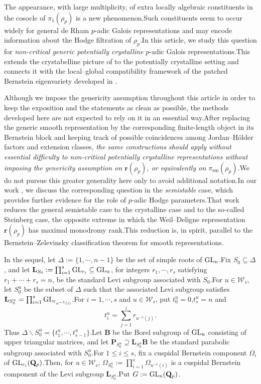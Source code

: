 \documentclass[10pt]{article}
\newcommand{\GLN}{{\rm GL}}
\newcommand{\wdre}{{\textbf{r}}}
\newcommand{\bB}{{\mathbf{B}}}
\newcommand{\bL}{{\mathbf{L}}}
\newcommand{\bP}{{\mathbf{P}}}
\newcommand{\bQ}{{\mathbf{Q}}}
\newcommand{\sW}{\mathscr W}
\begin{document}
The appearance, with large multiplicity, of extra locally algebraic constituents in the cosocle of $\pi_{1}(\rho_p)$ is a new phenomenon.\;Such constituents seem to occur widely for general de Rham $p$-adic Galois representations and may encode information about the Hodge filtration of $\rho_p$.\;In this article, we study this question for \textit{non-critical generic potentially crystalline} $p$-adic Galois representations.\;This extends the crystabelline picture of \cite{ParaDing2024} to the potentially crystalline setting and connects it with the local--global compatibility framework of the patched Bernstein eigenvariety developed in \cite{Ding2021}.\;

Although we impose the genericity assumption throughout this article in order to keep the exposition and the statements as clean as possible, the methods developed here are not expected to rely on it in an essential way.\;After replacing the generic smooth representation by the corresponding finite-length object in its Bernstein block and keeping track of possible coincidences among Jordan--H\"older factors and extension classes,  \textit{the same constructions should apply without essential difficulty to non-critical potentially crystalline representations without imposing the genericity assumption on $\wdre(\rho_p)$, or equivalently on $\pi_{\mathrm{sm}}(\rho_p)$}.\;We do not pursue this greater generality here only to avoid additional notation.\;In our work \cite{HEparaforsemitable}, we discuss the corresponding question in the \textit{semistable} case, which provides further evidence for the role of $p$-adic Hodge parameters.\;That work reduces the general semistable case to the crystalline case and to the so-called Steinberg case, the opposite extreme in which the Weil--Deligne representation $\wdre(\rho_p)$  has maximal monodromy rank.\;This reduction is, in spirit, parallel to the Bernstein--Zelevinsky classification theorem for smooth representations.\;




In the sequel, let $\Delta:=\{1,\cdots,n-1\}$ be the set of simple roots of $\GLN_n$.\;Fix $S_0\subseteq \Delta$, and let $\bL_{S_0}:=\prod_{i=1}^s\GLN_{r_i}\subseteq \GLN_n$, for integers $r_1,\cdots,r_s$ satisfying $r_1+\cdots+r_s=n$, be the standard Levi subgroup associated with $S_0$.\;For $u\in \sW_s$, let $S_0^u$ be the subset of $\Delta$ such that the associated Levi subgroup satisfies $\bL_{S_0^u}=\prod_{i=1}^s\GLN_{r_{u^{-1}(i)}}$.\;For $i=1,\cdots,s$ and $u\in\sW_s$, put $t_0^u=0$,\;$t_{s}^u=n$ and
\[t_i^u=\sum_{j=1}^i r_{u^{-1}(j)}.\]
Thus $\Delta\backslash S_0^u=\{t_1^u,\cdots,t_{s-1}^u\}$.\;Let $\bB$ be the Borel subgroup of $\GLN_n$ consisting of upper triangular matrices, and let $\bP_{S_0^u}\supseteq \bL_{S_0^u}\bB$ be the standard parabolic subgroup associated with $S_0^u$.\;For $1\leq i\leq s$, fix a cuspidal Bernstein component $\Omega_{i}$ of $\GLN_{r_i}(\bQ_p)$.\;Then, for $u\in \sW_s$, $\Omega_{S^u_0}:=\prod_{i=1}^s\Omega_{u^{-1}(i)}$ is a cuspidal Bernstein component of the Levi subgroup $\bL_{S^u_0}$.\;Put $G:=\GLN_n(\bQ_p)$.\;
\end{document}
